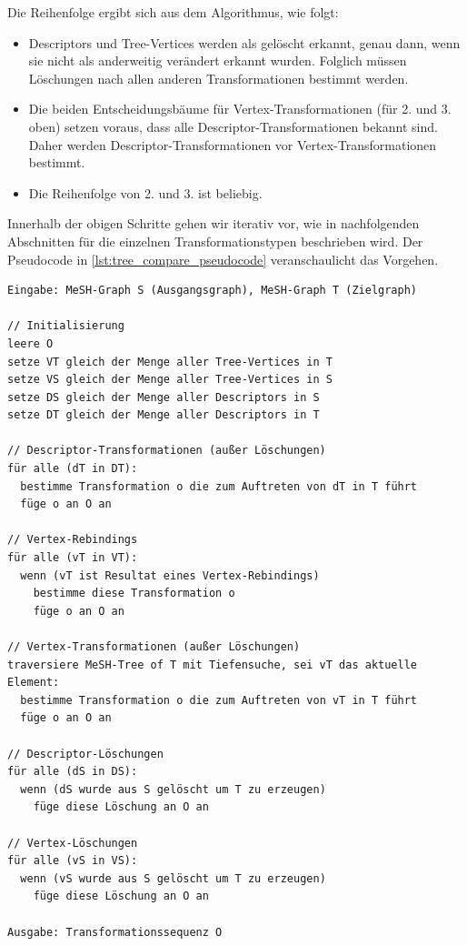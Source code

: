 Die Reihenfolge ergibt sich aus dem Algorithmus, wie folgt:
\begin{itemize}
 \item Descriptors und Tree-Vertices werden als gelöscht erkannt, genau dann, wenn sie nicht als anderweitig verändert erkannt wurden. Folglich müssen Löschungen nach allen anderen Transformationen bestimmt werden.
 \item Die beiden Entscheidungsbäume für Vertex-Transformationen (für 2. und 3. oben) setzen voraus, dass alle Descriptor-Transformationen bekannt sind. Daher werden Descriptor-Transformationen vor Vertex-Transformationen bestimmt.
 \item Die Reihenfolge von 2. und 3. ist beliebig.
\end{itemize}

Innerhalb der obigen Schritte gehen wir iterativ vor, wie in nachfolgenden Abschnitten für die einzelnen Transformationstypen beschrieben wird. Der Pseudocode in \autoref{lst:tree_compare_pseudocode} veranschaulicht das Vorgehen.

\lstset{caption=Algorithmus zur Transformationsrekonstruktion}
\lstset{label=lst:tree_compare_pseudocode}
\begin{lstlisting}[float=htbp] 
Eingabe: MeSH-Graph S (Ausgangsgraph), MeSH-Graph T (Zielgraph)

// Initialisierung
leere O 
setze VT gleich der Menge aller Tree-Vertices in T
setze VS gleich der Menge aller Tree-Vertices in S
setze DS gleich der Menge aller Descriptors in S
setze DT gleich der Menge aller Descriptors in T

// Descriptor-Transformationen (außer Löschungen)
für alle (dT in DT):
  bestimme Transformation o die zum Auftreten von dT in T führt
  füge o an O an

// Vertex-Rebindings
für alle (vT in VT):
  wenn (vT ist Resultat eines Vertex-Rebindings)
    bestimme diese Transformation o
    füge o an O an

// Vertex-Transformationen (außer Löschungen)
traversiere MeSH-Tree of T mit Tiefensuche, sei vT das aktuelle Element:
  bestimme Transformation o die zum Auftreten von vT in T führt
  füge o an O an

// Descriptor-Löschungen
für alle (dS in DS):
  wenn (dS wurde aus S gelöscht um T zu erzeugen)
    füge diese Löschung an O an  

// Vertex-Löschungen
für alle (vS in VS):
  wenn (vS wurde aus S gelöscht um T zu erzeugen)
    füge diese Löschung an O an

Ausgabe: Transformationssequenz O
\end{lstlisting} 

